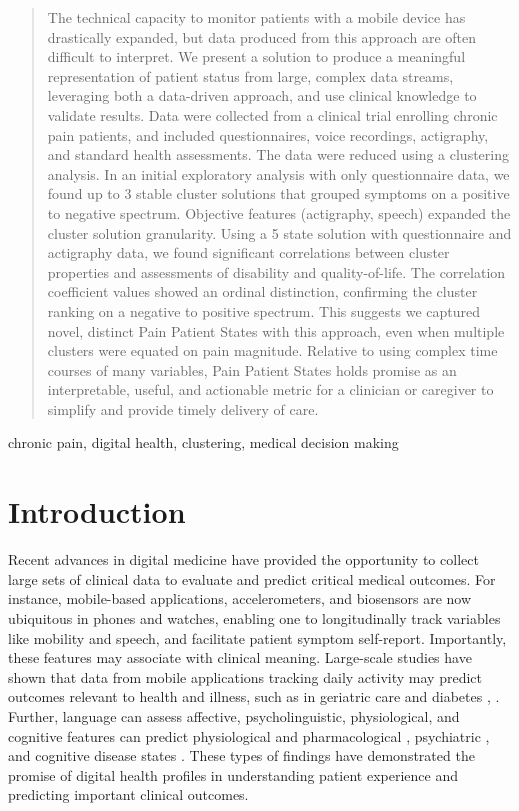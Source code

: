 \documentclass[conference]{IEEEtran}
\begin{document}
\begin{abstract}
The technical capacity to monitor patients with a mobile device has drastically expanded, but data produced from this approach are often difficult to interpret. We present a solution to produce a meaningful representation of patient status from large, complex data streams, leveraging both a data-driven approach, and use clinical knowledge to validate results. Data were collected from a clinical trial enrolling chronic pain patients, and included questionnaires, voice recordings, actigraphy, and standard health assessments. The data were reduced using a clustering analysis. In an initial exploratory analysis with only questionnaire data, we found up to 3 stable cluster solutions that grouped symptoms on a positive to negative spectrum. Objective features (actigraphy, speech) expanded the cluster solution granularity. Using a 5 state solution with questionnaire and actigraphy data, we found significant correlations between cluster properties and assessments of disability and quality-of-life. The correlation coefficient values showed an ordinal distinction, confirming the cluster ranking on a negative to positive spectrum. This suggests we captured novel, distinct Pain Patient States with this approach, even when multiple clusters were equated on pain magnitude. Relative to using complex time courses of many variables, Pain Patient States holds promise as an interpretable, useful, and actionable metric for a clinician or caregiver to simplify and provide timely delivery of care.
\end{abstract}

\begin{IEEEkeywords}
chronic pain, digital health, clustering, medical decision making 

\end{IEEEkeywords}

\section{Introduction}

Recent advances in digital medicine have provided the opportunity to collect large sets of clinical data to evaluate and predict critical medical outcomes. For instance, mobile-based applications, accelerometers, and biosensors are now ubiquitous in phones and watches, enabling one to longitudinally track variables like mobility and speech, and facilitate patient symptom self-report. Importantly, these features may associate with clinical meaning. Large-scale studies have shown that data from mobile applications tracking daily activity may predict outcomes relevant to health and illness, such as in geriatric care and diabetes \cite{Ekelund2009}, \cite{Smirnova2020}. Further, language can assess affective, psycholinguistic, physiological, and cognitive features can predict physiological and pharmacological \cite{Agurto2020}, psychiatric \cite{Corcoran2018a}, and cognitive disease states \cite{Eyigoz2020}. These types of findings have demonstrated the promise of digital health profiles in understanding patient experience and predicting important clinical outcomes.
\end{document}
